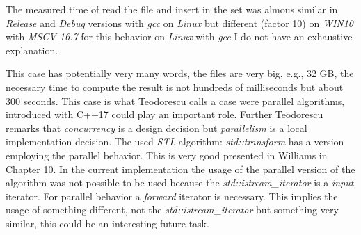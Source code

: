 \documentclass{article}
\begin{document}
The measured time of read the file and insert in the set was almous similar in \textit{Release} and \textit{Debug} versions with \textit{gcc} on \textit{Linux}  but different (factor 10) on \textit{WIN10} with \textit{MSCV 16.7} for this behavior on \textit{Linux} with \textit{gcc} I do not have an exhaustive explanation.

This case has potentially very many words, the files are very big, e.g., 32 GB, the necessary time to compute the result is not hundreds of milliseconds but about 300 seconds. This case is what Teodorescu \cite{DBLP:journals/accu/161/Teodorescu/paralleAlgo} calls a case were parallel algorithms, introduced with C++17 could play an important role. Further Teodorescu remarks that \textit{concurrency} is a design decision but \textit{parallelism} is a local implementation decision. The used \textit{STL} algorithm: \textit{std::transform} has a version employing the parallel behavior. This is very good presented in Williams \cite{DBLP:books/Williams2019} in Chapter 10. In the current implementation the usage of the parallel version of the algorithm was not possible to be used because the \textit{std::istream\_iterator} is a \textit{input} iterator. For parallel behavior a \textit{forward} iterator is necessary. This implies the usage of something different, not the \textit{std::istream\_iterator} but something very similar, this could be an interesting future task.
 

\newpage

 

\end{document}
